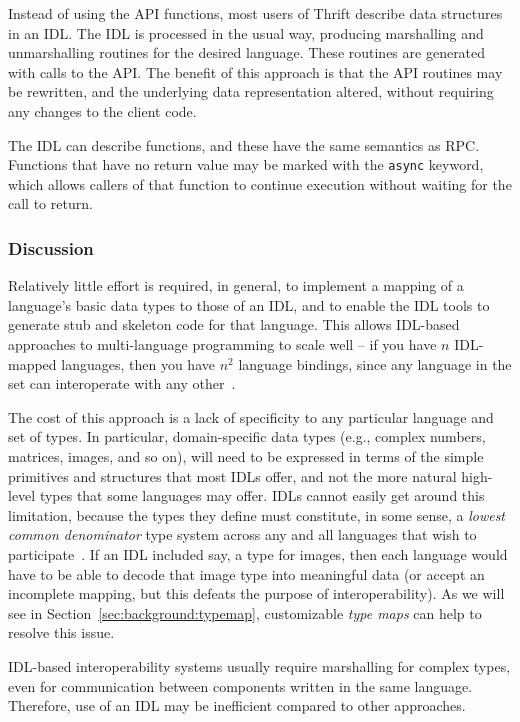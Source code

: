 Instead of using the API functions, most users of Thrift describe data structures in an IDL. The IDL is processed in the usual way, producing marshalling and unmarshalling routines for the desired language. These routines are generated with calls to the API. The benefit of this approach is that the API routines may be rewritten, and the underlying data representation altered, without requiring any changes to the client code.

The IDL can describe functions, and these have the same semantics as RPC. Functions that have no return value may be marked with the \texttt{async} keyword, which allows callers of that function to continue execution without waiting for the call to return.



\subsubsection{Discussion} 
\label{idl_discussion}

Relatively little effort is required, in general, to implement a mapping of a language's basic data types to those of an IDL, and to enable the IDL tools to generate stub and skeleton code for that language. This allows IDL-based approaches to multi-language programming to scale well -- if you have $n$ IDL-mapped languages, then you have $n^2$ language bindings, since any language in the set can interoperate with any other~\cite{kaplan98idl}.

The cost of this approach is a lack of specificity to any particular language and set of types. In particular, domain-specific data types (e.g., complex numbers, matrices, images, and so on), will need to be expressed in terms of the simple primitives and structures that most IDLs offer, and not the more natural high-level types that some languages may offer. IDLs cannot easily get around this limitation, because the types they define must constitute, in some sense, a \emph{lowest common denominator} type system across any and all languages that wish to participate~\cite{kaplan98idl}. If an IDL included say, a type for images, then each language would have to be able to decode that image type into meaningful data (or accept an incomplete mapping, but this defeats the purpose of interoperability). As we will see in Section~\ref{sec:background:typemap}, customizable \emph{type maps} can help to resolve this issue.

IDL-based interoperability systems usually require marshalling for complex types, even for communication between components written in the same language. Therefore, use of an IDL may be inefficient compared to other approaches.
